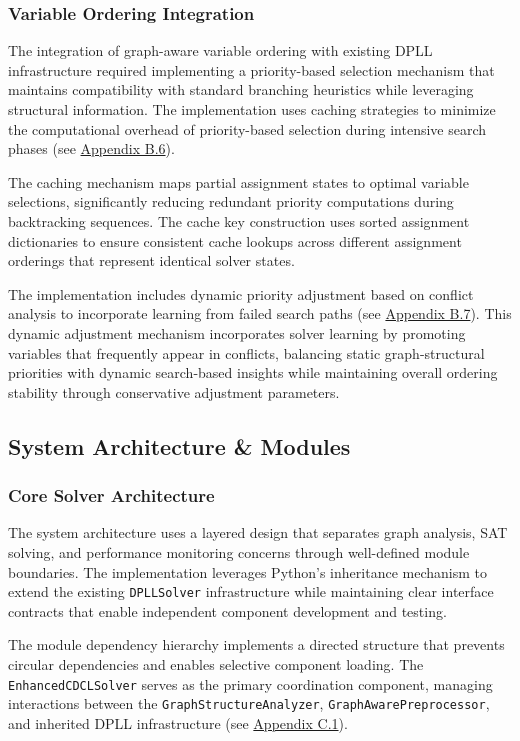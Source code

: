 \subsubsection{Variable Ordering Integration}

The integration of graph-aware variable ordering with existing DPLL infrastructure required implementing a priority-based selection mechanism that maintains compatibility with standard branching heuristics while leveraging structural information. The implementation uses caching strategies to minimize the computational overhead of priority-based selection during intensive search phases (see \hyperref[appendix:priority-selection]{Appendix B.6}).

The caching mechanism maps partial assignment states to optimal variable selections, significantly reducing redundant priority computations during backtracking sequences. The cache key construction uses sorted assignment dictionaries to ensure consistent cache lookups across different assignment orderings that represent identical solver states.

The implementation includes dynamic priority adjustment based on conflict analysis to incorporate learning from failed search paths (see \hyperref[appendix:priority-adjustment]{Appendix B.7}). This dynamic adjustment mechanism incorporates solver learning by promoting variables that frequently appear in conflicts, balancing static graph-structural priorities with dynamic search-based insights while maintaining overall ordering stability through conservative adjustment parameters.

\subsection{System Architecture \& Modules}

\subsubsection{Core Solver Architecture}

The system architecture uses a layered design that separates graph analysis, SAT solving, and performance monitoring concerns through well-defined module boundaries. The implementation leverages Python's inheritance mechanism to extend the existing \texttt{DPLLSolver} infrastructure while maintaining clear interface contracts that enable independent component development and testing.

The module dependency hierarchy implements a directed structure that prevents circular dependencies and enables selective component loading. The \texttt{EnhancedCDCLSolver} serves as the primary coordination component, managing interactions between the \texttt{Graph\-Structure\-Analyzer}, \texttt{GraphAwarePreprocessor}, and inherited DPLL infrastructure (see \hyperref[appendix:module-dependency]{Appendix C.1}).

